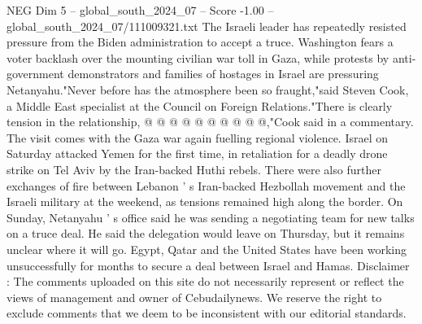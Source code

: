 \begin{textsample}{NEG Dim 5 – global\_south\_2024\_07 – Score -1.00 – global\_south\_2024\_07/111009321.txt}
The Israeli leader has repeatedly resisted pressure from the Biden administration to accept a truce.
Washington fears a voter backlash over the mounting civilian war toll in Gaza, while protests by anti-government demonstrators and families of hostages in Israel are pressuring Netanyahu."Never before has the atmosphere been so fraught,"said Steven Cook, a Middle East specialist at the Council on Foreign Relations."There is clearly tension in the relationship, @ @ @ @ @ @ @ @ @ @,"Cook said in a commentary.
The visit comes with the Gaza war again fuelling regional violence.
Israel on Saturday attacked Yemen for the first time, in retaliation for a deadly drone strike on Tel Aviv by the Iran-backed Huthi rebels.
There were also further exchanges of fire between Lebanon ' s Iran-backed Hezbollah movement and the Israeli military at the weekend, as tensions remained high along the border.
On Sunday, Netanyahu ' s office said he was sending a negotiating team for new talks on a truce deal.
He said the delegation would leave on Thursday, but it remains unclear where it will go.
Egypt, Qatar and the United States have been working unsuccessfully for months to secure a deal between Israel and Hamas.
Disclaimer : The comments uploaded on this site do not necessarily represent or reflect the views of management and owner of Cebudailynews.
We reserve the right to exclude comments that we deem to be inconsistent with our editorial standards.

\end{textsample}

